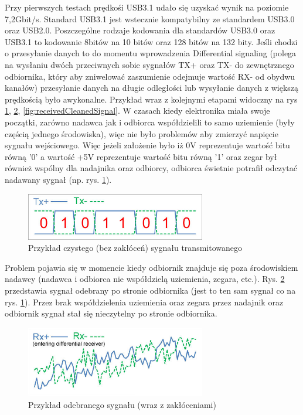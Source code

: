 \documentclass{BscUS}
\begin{document}
\newline
Przy pierwszych testach prędkośi USB3.1 udało się uzyskać wynik na poziomie 7,2Gbit/s. Standard USB3.1 jest wstecznie kompatybilny ze standardem USB3.0 oraz USB2.0.
\cite{USB30Doc}
\newline
\indent Poszczególne rodzaje kodowania dla standardów USB3.0 oraz USB3.1 to kodowanie 8bitów na 10 bitów oraz 128 bitów na 132 bity. 
Jeśli chodzi o przesyłanie danych to do momentu wprowadzenia Differential signaling (polega na wysłaniu dwóch przeciwnych sobie sygnałów TX+ oraz TX- do zewnętrznego odbiornika, który aby zniwelować zaszumienie odejmuje wartość RX- od obydwu kanałów) przesyłanie danych na długie odległości lub wysyłanie danych z większą prędkością było awykonalne. Przykład wraz z kolejnymi etapami widoczny na rys \ref{fig:cleanSignal}, \ref{fig:receivedNoiseSignal}, \ref{fig:receivedCleanedSignal}.
\newline
\indent W czasach kiedy elektronika miała swoje początki, zarówno nadawca jak i odbiorca współdzielili to samo uziemienie (były częścią jednego środowiska), więc nie było problemów aby zmierzyć napięcie sygnału wejściowego. Więc jeżeli założenie było iż 0V reprezentuje wartość bitu równą '0' a wartość +5V reprezentuje wartość bitu równą '1' oraz zegar był również wspólny dla nadajnika oraz odbiorcy, odbiorca świetnie potrafił odczytać nadawany sygnał (np. rys. \ref{fig:cleanSignal}).
\begin{figure}[H]
\centering
\includegraphics[width=0.7\textwidth]{./img/cleanSignal}
\caption{Przykład czystego (bez zakłóceń) sygnału transmitowanego \cite{cleanSignal}}
\label{fig:cleanSignal}
\end{figure}
\noindent Problem pojawia się w momencie kiedy odbiornik znajduje się poza środowiskiem nadawcy (nadawca i odbiorca nie współdzielą uziemienia, zegara, etc.). Rys. \ref{fig:receivedNoiseSignal} przedstawia sygnał odebrany po stronie odbiornika (jest to ten sam sygnał co na rys. \ref{fig:cleanSignal}). Przez brak współdzielenia uziemienia oraz zegara przez nadajnik oraz odbiornik sygnał stał się nieczytelny po stronie odbiornika.
\begin{figure}[H]
\centering
\includegraphics[width=0.7\textwidth]{./img/receivedNoiseSignal}
\caption{Przykład odebranego sygnału (wraz z zakłóceniami) \cite{receivedNoiseSignal}}

\label{fig:receivedNoiseSignal}
\end{figure}
\end{document}
